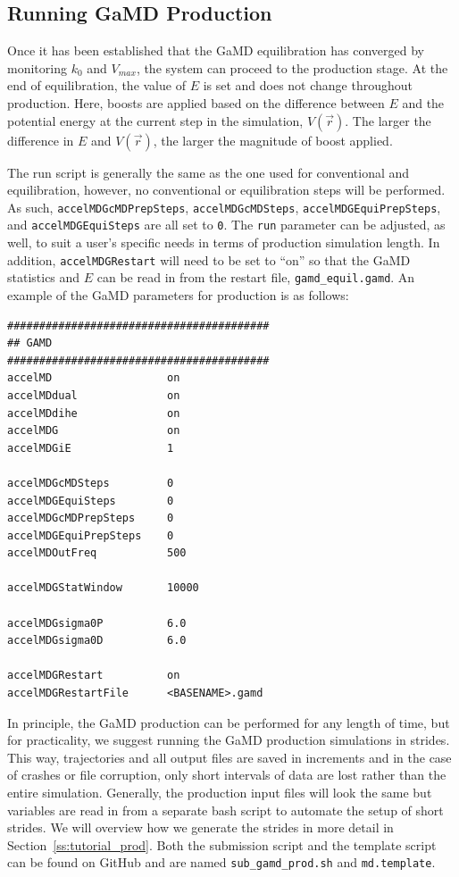 \documentclass[9pt,tutorial]{livecoms}
\begin{document}
\subsection{Running GaMD Production}
\label{ss:gamd_production}
Once it has been established that the GaMD equilibration has converged by monitoring $k_{0}$ and $V_{max}$, the system can proceed to the production stage. At the end of equilibration, the value of $E$ is set and does not change throughout production. Here, boosts are applied based on the difference between $E$ and the potential energy at the current step in the simulation, $V\left(\vec{r}\right)$. The larger the difference in $E$ and $V\left(\vec{r}\right)$, the larger the magnitude of boost applied. 

The run script is generally the same as the one used for conventional and equilibration, however, no conventional or equilibration steps will be performed. As such, \texttt{accelMDGcMDPrepSteps}, \texttt{accelMDGcMDSteps}, \texttt{accelMDGEquiPrepSteps}, and \texttt{accelMDGEquiSteps} are all set to \texttt{0}. The \texttt{run} parameter can be adjusted, as well, to suit a user's specific needs in terms of production simulation length. In addition, \texttt{accelMDGRestart} will need to be set to ``on'' so that the GaMD statistics and $E$ can be read in from the restart file, \texttt{gamd\_equil.gamd}. An example of the GaMD parameters for production is as follows:

\begin{lstlisting}[label=gamd_prod,caption=md.*.in, basicstyle=\small,backgroundcolor=\color{light-gray}]
#########################################
## GAMD                    
#########################################
accelMD                  on             
accelMDdual              on
accelMDdihe              on
accelMDG                 on        
accelMDGiE               1             
         
accelMDGcMDSteps         0        
accelMDGEquiSteps        0     
accelMDGcMDPrepSteps     0         
accelMDGEquiPrepSteps    0         
accelMDOutFreq           500

accelMDGStatWindow       10000

accelMDGsigma0P          6.0            
accelMDGsigma0D          6.0 

accelMDGRestart          on 
accelMDGRestartFile      <BASENAME>.gamd  

\end{lstlisting}

In principle, the GaMD production can be performed for any length of time, but for practicality, we suggest running the GaMD production simulations in strides. This way, trajectories and all output files are saved in increments and in the case of crashes or file corruption, only short intervals of data are lost rather than the entire simulation. Generally, the production input files will look the same but variables are read in from a separate bash script to automate the setup of short strides. We will overview how we generate the strides in more detail in Section~\ref{ss:tutorial_prod}. Both the submission script and the template script can be found on GitHub and are named \texttt{sub\_gamd\_prod.sh} and \texttt{md.template}.
\end{document}
